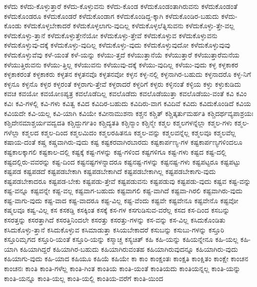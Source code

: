 {ಕಳೆದು
ಕಳೆದು-ಕೊಳ್ಳುತ್ತಾರೆ
ಕಳೆದು-ಕೊಳ್ಳುವನು
ಕಳೆದು-ಕೊಂಡ
ಕಳೆದುಕೊಂಡಂತಾಗಿರುವನು
ಕಳೆದುಕೊಂಡಂತೆ
ಕಳೆದುಕೊಂಡರೂ
ಕಳೆದುಕೊಂಡರೆ
ಕಳೆದುಕೊಂಡಾಗ
ಕಳೆದುಕೊಂಡಿದ್ದ-ಕ್ಕಾಗಿ
ಕಳೆದುಕೊಂಡಿರ-ಬಹುದು
ಕಳೆದು-ಕೊಂಡು
ಕಳೆದುಕೊಳ್ಳಬೇಕಾದರೆ
ಕಳೆದುಕೊಳ್ಳಲಾಗು-ವುದಿಲ್ಲ
ಕಳೆದುಕೊಳ್ಳಲೆತ್ನಿಸುವನು
ಕಳೆದುಕೊಳ್ಳು-ತ್ತೇ-ವಲ್ಲ
ಕಳೆದುಕೊಳ್ಳು-ತ್ತಾನೆ
ಕಳೆದುಕೊಳ್ಳುತ್ತೇನೆಯೋ
ಕಳೆದುಕೊಳ್ಳು-ತ್ತೇವೆ
ಕಳೆದುಕೊಳ್ಳುವ
ಕಳೆದುಕೊಳ್ಳುವನು
ಕಳೆದುಕೊಳ್ಳುವು-ದಕ್ಕೆ
ಕಳೆದುಕೊಳ್ಳು-ವುದಿಲ್ಲ
ಕಳೆದುಕೊಳ್ಳು-ವುದು
ಕಳೆದುಕೊಳ್ಳುವುದೋ
ಕಳೆದುಕೊಳ್ಳುವುವು
ಕಳೆದುಕೊಳ್ಳುವೆವು
ಕಳೆ-ಯಂತೆ
ಕಳೆ-ಯನ್ನು
ಕಳೆಯು-ತ್ತದೆ
ಕಳೆಯುತ್ತಾನೆಯೆ
ಕಳೆಯುತ್ತಾರೆ
ಕಳೆಯುತ್ತಾರೆಮನೆಯ
ಕಳೆಯುತ್ತಿರುವನು
ಕಳೆಯು-ತ್ತಿಲ್ಲ
ಕಳೆಯುವನು
ಕಳೆಯುವು-ದಕ್ಕೆ
ಕಳೆಯು-ವುದಿಲ್ಲ
ಕಳೆಯು-ವುದು
ಕಳ್ಳ
ಕಳ್ಳಕಾಕರ
ಕಳ್ಳಕಾಕರಂತೆ
ಕಳ್ಳಕಾಕರು
ಕಳ್ಳತನ
ಕಳ್ಳತನವೊ
ಕಳ್ಳತನವೋ
ಕಳ್ಳನ
ಕಳ್ಳ-ನಲ್ಲಿ
ಕಳ್ಳನಾಗಿರ-ಬಹುದು
ಕಳ್ಳನಾದರೊ
ಕಳ್ಳ-ನಿಗೆ
ಕಳ್ಳನೂ
ಕಳ್ಳನೊ
ಕಳ್ಳರ
ಕಳ್ಳರಂತೆ
ಕಳ್ಳರಾಗು-ತ್ತೇವೆ
ಕಳ್ಳರಾದರೆ
ಕಳ್ಳರಿಗೆ
ಕಳ್ಳರು
ಕಳ್ಳಿನಂತೆ
ಕಳ್ಳಿಯ
ಕಳ್ಳು
ಕಳ್ಳುಕುಡಿದು
ಕವಚ
ಕವಯೋ
ಕವಯೋಽಪ್ಯತ್ರ
ಕವಲೊಡೆದಿಲ್ಲ
ಕವಲೊಡೆದು
ಕವಲೊಡೆಯುತ್ತಾ
ಕವಲೊಡೆಯು-ವಂತೆ
ಕವಿ
ಕವಿಂ
ಕವಿಃ
ಕವಿ-ಗಳಲ್ಲಿ
ಕವಿ-ಗಳು
ಕವಿತ್ವ
ಕವಿದ
ಕವಿದಿರ-ಬಹುದು
ಕವಿದಿರು-ವಾಗ
ಕವಿದಿವೆ
ಕವಿದು
ಕವಿದುಕೊಂಡಿದೆ
ಕವಿಯ
ಕವಿಯದೇ
ಕವಿ-ಯಲ್ಲ
ಕವಿ-ಯಾಗಿ
ಕವಿಯೇ
ಕವೀನಾಮುಶನಾ
ಕಶ್ಚನ
ಕಶ್ಚಿತ್
ಕಶ್ಚಿತ್ಕರ್ತುಮರ್ಹತಿ
ಕಶ್ಚಿದರ್ಥವ್ಯಪಾಶ್ರಯಃ
ಕಶ್ಚಿದೇನಮಾಶ್ಚರ್ಯವದ್ವದತಿ
ಕಶ್ಚಿದ್ದುರ್ಗತಿಂ
ಕಶ್ಚಿದ್ಯತತಿ
ಕಶ್ಚಿನ್ಮಾಂ
ಕಶ್ಚಿನ್ಮೇ
ಕಶ್ಮಲ
ಕಶ್ಮಲಗಳನ್ನೆಲ್ಲಾ
ಕಶ್ಮಲ-ಗಳು
ಕಶ್ಮಲ-ಗಳೆಲ್ಲಾ
ಕಶ್ಮಲದ
ಕಶ್ಮಲ-ದಿಂದ
ಕಶ್ಮಲಮಿದಂ
ಕಶ್ಮಲರಹಿತನೂ
ಕಶ್ಮಲ-ವನ್ನು
ಕಶ್ಮಲವನ್ನೆಲ್ಲ
ಕಶ್ಮಲವೂ
ಕಶ್ಮಲವೆಲ್ಲ
ಕಷಾಯ-ದಂತೆ
ಕಷ್ಚ
ಕಷ್ಚವಾಗಿರು-ವುದು
ಕಷ್ಟ
ಕಷ್ಟಕರವಾಗಿರಬಾರದು
ಕಷ್ಟಕಾರ್ಪಣ್ಯ-ಗಳ
ಕಷ್ಟಕಾರ್ಪಣ್ಯಗಳಿಂದಲೂ
ಕಷ್ಟಕಾಲಕ್ಕಾಗಲಿ
ಕಷ್ಟಕಾಲ-ದಲ್ಲಿ
ಕಷ್ಟಕ್ಕೆ
ಕಷ್ಟ-ಗಳನ್ನು
ಕಷ್ಟ-ಗಳಿಂದ
ಕಷ್ಟಗಳಿಗೂ
ಕಷ್ಟ-ಗಳು
ಕಷ್ಟದ
ಕಷ್ಟ-ದಲ್ಲಿ
ಕಷ್ಟದಲ್ಲಿರು-ವವರನ್ನು
ಕಷ್ಟ-ದಿಂದ
ಕಷ್ಟನಷ್ಟಗಳನ್ನಾದರೂ
ಕಷ್ಟನಷ್ಟ-ಗಳನ್ನು
ಕಷ್ಟನಷ್ಟ-ಗಳು
ಕಷ್ಟಪಟ್ಟರೂ
ಕಷ್ಟಪಟ್ಟು
ಕಷ್ಟಪಡ
ಕಷ್ಟಪಡದೆ
ಕಷ್ಟಪಡಬೇಕಾಗಿ
ಕಷ್ಟಪಡಬೇಕಾಗಿದೆ
ಕಷ್ಟಪಡಬೇಕಾಗಿಲ್ಲ
ಕಷ್ಟಪಡಬೇಕಾಗು-ವುದು
ಕಷ್ಟಪಡಬೇಕಾದರೂ
ಕಷ್ಟಪಡ-ಬೇಕು
ಕಷ್ಟಪಡು-ತ್ತೇವೆ
ಕಷ್ಟಪಡುವನು
ಕಷ್ಟಪಡುವು
ಕಷ್ಟಪಡು-ವುದು
ಕಷ್ಟವ
ಕಷ್ಟ-ವನ್ನು
ಕಷ್ಟ-ವನ್ನೂ
ಕಷ್ಟವನ್ನೇ
ಕಷ್ಟ-ವಲ್ಲ
ಕಷ್ಟವಾಗ-ಬಹುದು
ಕಷ್ಟವಾಗಲಿ
ಕಷ್ಟ-ವಾಗಿದೆ
ಕಷ್ಟವಾ-ಗಿರಲಿ
ಕಷ್ಟವಾಗಿರು-ವುದು
ಕಷ್ಟ-ವಾಗು-ವುದು
ಕಷ್ಟ-ವಾದ
ಕಷ್ಟ-ವಾದರೂ
ಕಷ್ಟ-ವಿಲ್ಲ
ಕಷ್ಟ-ವೆಂದು
ಕಷ್ಟವೇ
ಕಷ್ಟವೇನೂ
ಕಷ್ಟವೇನೊ
ಕಷ್ಟವೋ
ಕಷ್ಮಲವೂ
ಕಷ್ವ-ವಿಲ್ಲ
ಕಸ
ಕಸಕಡ್ಡಿ
ಕಸಕ್ಕಿಂತ
ಕಸಕ್ಕೆ
ಕಸ-ಗಳ
ಕಸಗುಡಿಸುವ-ವರೆಲ್ಲ
ಕಸದ
ಕಸ-ದಿಂದ
ಕಸಬನ್ನು
ಕಸರತ್ತನ್ನು
ಕಸರತ್ತಾಗಿದೆ
ಕಸರತ್ತಿನಿಂದಲೇ
ಕಸರತ್ತು
ಕಸರತ್ತು-ಗಳನ್ನು
ಕಸ-ವನ್ನು
ಕಸ-ವಿಲ್ಲ
ಕಸಿದುಕೊಂಡಿತು
ಕಸಿದುಕೊಳ್ಳು-ತ್ತಾನೆ
ಕಸಿದುಕೊಳ್ಳುವ
ಕಸಿಮಾಡುತ್ತಾ
ಕಸಿಯಬೇಕಾದರೆ
ಕಸುಬನ್ನು
ಕಸುಬು-ಗಳನ್ನು
ಕಸ್ತೂರಿ
ಕಸ್ತೂರಿಮೃಗದ
ಕಸ್ತೂರಿ-ಯಂತೆ
ಕಸ್ತೂರಿ-ಯನ್ನು
ಕಸ್ಮಾಚ್ಚ
ಕಸ್ಯಚಿತ್
ಕಹಿ
ಕಹಿ-ಯನ್ನು
ಕಹಿಯನ್ನೇನೂ
ಕಹಿ-ಯಲ್ಲ
ಕಹಿ-ಯಾಗಿ
ಕಹಿಯಾಗಿದ್ದರೆ
ಕಹಿಯಾಗಿರ-ಬಹುದು
ಕಹಿಯಾಗಿರುವಂತಹ
ಕಹಿಯಾಗಿರುವುದನ್ನೂ
ಕಹಿಯಾಗಿರು-ವುದು
ಕಹಿಯಾಗು-ವುದು
ಕಹಿ-ಯಾದ
ಕಹಿಯೂ
ಕಹಿಯೆ
ಕಹಿಯೇ
ಕಾ
ಕಾಂ
ಕಾಂಕ್ಷಂತಃ
ಕಾಂಕ್ಷತಿ
ಕಾಂಕ್ಷಿತಂ
ಕಾಂಕ್ಷೇ
ಕಾಂಚನ
ಕಾಂಚನಃ
ಕಾಂತಿ
ಕಾಂತಿ-ಗಳೆಲ್ಲ
ಕಾಂತಿ-ಗಿಂತ
ಕಾಂತಿಯ
ಕಾಂತಿ-ಯಂತೆ
ಕಾಂತಿಯದು
ಕಾಂತಿಯನ್ನಲ್ಲ
ಕಾಂತಿ-ಯನ್ನು
ಕಾಂತಿ-ಯನ್ನೂ
ಕಾಂತಿ-ಯಲ್ಲ
ಕಾಂತಿ-ಯಲ್ಲಿ
ಕಾಂತಿಯ-ವರೆಗೆ
ಕಾಂತಿ-ಯಿಂದ
}
